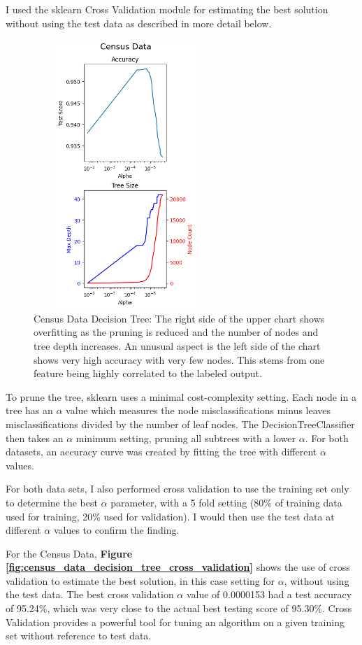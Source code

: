 \documentclass[letterpaper]{article} %
\begin{document}
I used the sklearn Cross Validation module for estimating the best solution without using the test data as described in more detail below.

\begin{figure}[h]
\centering
\includegraphics[width=2.75in, height=4in]{figures/Census_Data_decision_tree.png}
\caption{Census Data Decision Tree:  The right side of the upper chart shows overfitting as the pruning is reduced and the number of nodes and tree depth increases.  An unusual aspect is the left side of the chart shows very high accuracy with very few nodes.  This stems from one feature being highly correlated to the labeled output.}
\label{fig:census_data_decision_tree}
\end{figure}

To prune the tree, sklearn uses a minimal cost-complexity setting.  Each node in a tree has an $\alpha$ value which measures the node misclassifications minus leaves misclassifications divided by the number of leaf nodes.  The DecisionTreeClassifier then takes an $\alpha$ minimum setting, pruning all subtrees with a lower $\alpha$.   For both datasets, an accuracy curve was created by fitting the tree with different $\alpha$ values.  

For both data sets, I also performed cross validation to use the training set only to determine the best $\alpha$ parameter, with a 5 fold setting (80\% of training data used for training, 20\% used for validation).  I would then use the test data at different $\alpha$ values to confirm the finding.

For the Census Data, \textbf{Figure \ref{fig:census_data_decision_tree_cross_validation}} shows the use of cross validation to estimate the best solution, in this case setting for $\alpha$, without using the test data.   The best cross validation $\alpha$ value of 0.0000153 had a test accuracy of 95.24\%, which was very close to the actual best testing score of 95.30\%.  Cross Validation provides a powerful tool for tuning an algorithm on a given training set without reference to test data.
\end{document}
